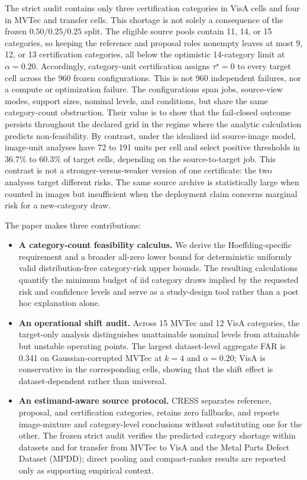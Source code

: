 The strict audit contains only three certification categories in VisA cells and four in MVTec and transfer cells. This shortage is not solely a consequence of the frozen $0.50/0.25/0.25$ split. The eligible source pools contain 11, 14, or 15 categories, so keeping the reference and proposal roles nonempty leaves at most 9, 12, or 13 certification categories, all below the optimistic 14-category limit at $\alpha=0.20$. Accordingly, category-unit certification assigns $\tau^\star=0$ to every target cell across the 960 frozen configurations. This is not 960 independent failures, nor a compute or optimization failure. The configurations span jobs, source-view modes, support sizes, nominal levels, and conditions, but share the same category-count obstruction. Their value is to show that the fail-closed outcome persists throughout the declared grid in the regime where the analytic calculation predicts non-feasibility. By contrast, under the idealized iid source-image model, image-unit analyses have 72 to 191 units per cell and select positive thresholds in 36.7\% to 60.3\% of target cells, depending on the source-to-target job. This contrast is not a stronger-versus-weaker version of one certificate: the two analyses target different risks. The same source archive is statistically large when counted in images but insufficient when the deployment claim concerns marginal risk for a new-category draw.

The paper makes three contributions:
\begin{itemize}
    \item \textbf{A category-count feasibility calculus.} We derive the Hoeffding-specific requirement and a broader all-zero lower bound for deterministic uniformly valid distribution-free category-risk upper bounds. The resulting calculations quantify the minimum budget of iid category draws implied by the requested risk and confidence levels and serve as a study-design tool rather than a post hoc explanation alone.
    \item \textbf{An operational shift audit.} Across 15 MVTec and 12 VisA categories, the target-only analysis distinguishes unattainable nominal levels from attainable but unstable operating points. The largest dataset-level aggregate FAR is 0.341 on Gaussian-corrupted MVTec at $k=4$ and $\alpha=0.20$; VisA is conservative in the corresponding cells, showing that the shift effect is dataset-dependent rather than universal.
    \item \textbf{An estimand-aware source protocol.} CRESS separates reference, proposal, and certification categories, retains zero fallbacks, and reports image-mixture and category-level conclusions without substituting one for the other. The frozen strict audit verifies the predicted category shortage within datasets and for transfer from MVTec to VisA and the Metal Parts Defect Dataset (MPDD); direct pooling and compact-ranker results are reported only as supporting empirical context.
\end{itemize}


